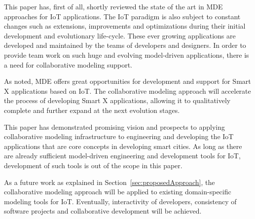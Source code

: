 This paper has, first of all, shortly reviewed the state of the art in MDE approaches for IoT applications. The IoT paradigm is also subject to constant changes such as extensions, improvements and optimizations during their initial development and evolutionary life-cycle. These ever growing applications are developed and maintained by the teams of developers and designers. In order to provide team work on such huge and evolving model-driven applications, there is a need for collaborative modeling support.

As noted, MDE offers great opportunities for development and support for Smart X applications based on IoT. The collaborative modeling approach will accelerate the process of developing Smart X applications, allowing it to qualitatively complete and further expand at the next evolution stages.

This paper has demonstrated promising vision and prospects to applying collaborative modeling infrastructure \cite{Kuryazov2018collab} to engineering and developing the IoT applications that are core concepts in developing smart cities. As long as there are already sufficient model-driven engineering and development tools for IoT, development of such tools is out of the scope in this paper.

As a future work as explained in Section~\ref{sec:proposedApproach}, the collaborative modeling approach will be applied to existing domain-specific modeling tools for IoT. Eventually, interactivity of developers, consistency of software projects and collaborative development will be achieved. 